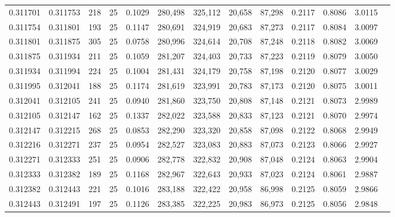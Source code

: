 \begin{tabular}{rrrrrrrrrrrrr}
0.311701 & 0.311753 &   218 &  25 &                                     0.1029 & 280,498 & 325,112 &  20,658 &  87,298 & 0.2117 & 0.8086 & 3.0115 \\
0.311754 & 0.311801 &   193 &  25 &                                     0.1147 & 280,691 & 324,919 &  20,683 &  87,273 & 0.2117 & 0.8084 & 3.0097 \\
0.311801 & 0.311875 &   305 &  25 &                                     0.0758 & 280,996 & 324,614 &  20,708 &  87,248 & 0.2118 & 0.8082 & 3.0069 \\
0.311875 & 0.311934 &   211 &  25 &                                     0.1059 & 281,207 & 324,403 &  20,733 &  87,223 & 0.2119 & 0.8079 & 3.0050 \\
0.311934 & 0.311994 &   224 &  25 &                                     0.1004 & 281,431 & 324,179 &  20,758 &  87,198 & 0.2120 & 0.8077 & 3.0029 \\
0.311995 & 0.312041 &   188 &  25 &                                     0.1174 & 281,619 & 323,991 &  20,783 &  87,173 & 0.2120 & 0.8075 & 3.0011 \\
0.312041 & 0.312105 &   241 &  25 &                                     0.0940 & 281,860 & 323,750 &  20,808 &  87,148 & 0.2121 & 0.8073 & 2.9989 \\
0.312105 & 0.312147 &   162 &  25 &                                     0.1337 & 282,022 & 323,588 &  20,833 &  87,123 & 0.2121 & 0.8070 & 2.9974 \\
0.312147 & 0.312215 &   268 &  25 &                                     0.0853 & 282,290 & 323,320 &  20,858 &  87,098 & 0.2122 & 0.8068 & 2.9949 \\
0.312216 & 0.312271 &   237 &  25 &                                     0.0954 & 282,527 & 323,083 &  20,883 &  87,073 & 0.2123 & 0.8066 & 2.9927 \\
0.312271 & 0.312333 &   251 &  25 &                                     0.0906 & 282,778 & 322,832 &  20,908 &  87,048 & 0.2124 & 0.8063 & 2.9904 \\
0.312333 & 0.312382 &   189 &  25 &                                     0.1168 & 282,967 & 322,643 &  20,933 &  87,023 & 0.2124 & 0.8061 & 2.9887 \\
0.312382 & 0.312443 &   221 &  25 &                                     0.1016 & 283,188 & 322,422 &  20,958 &  86,998 & 0.2125 & 0.8059 & 2.9866 \\
0.312443 & 0.312491 &   197 &  25 &                                     0.1126 & 283,385 & 322,225 &  20,983 &  86,973 & 0.2125 & 0.8056 & 2.9848 \\

\end{tabular}
